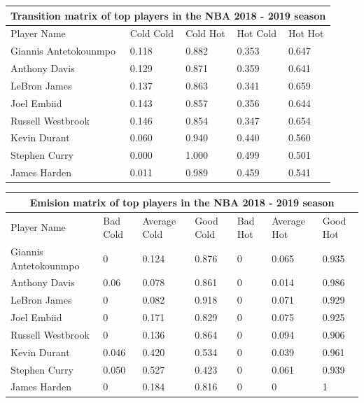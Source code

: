 \documentclass[12pt, authoryear]{elsarticle}
\begin{document}
\begin{tabular}{ |p{3cm}||p{2cm}|p{2cm}|p{2cm}|p{2cm}|  }
	\hline
	\multicolumn{5}{|c|}{Transition matrix of top players in the NBA 2018 - 2019 season} \\
	\hline
	Player Name & Cold Cold & Cold Hot &Hot Cold & Hot Hot\\
	\hline
	Giannis Antetokounmpo&   0.118 &	0.882 &	0.353 &	0.647\\
	Anthony Davis&   0.129&	0.871&	0.359&	0.641\\
	LeBron James &0.137&	0.863&	0.341&	0.659\\
	Joel Embiid&   0.143&	0.857&	0.356&	0.644\\
	Russell Westbrook& 0.146&	0.854&	0.347&	0.654\\
	Kevin Durant&   0.060&	0.940&	0.440&	0.560\\
	Stephen Curry& 0.000&	1.000&	0.499&	0.501\\
	James Harden&  0.011&	0.989&	0.459&	0.541\\
	\hline
\end{tabular}

\noindent\begin{tabular}{ |p{3cm}||p{1.5cm}|p{1.5cm}|p{1.5cm}|p{1.5cm}|p{1.5cm}|p{1.5cm}|  }
	\hline
	\multicolumn{7}{|c|}{Emision matrix of top players in the NBA 2018 - 2019 season} \\
	\hline
	Player Name &Bad Cold& Average Cold&	Good Cold&	Bad Hot&	Average Hot&	Good Hot\\
	\hline
	Giannis Antetokounmpo&   0&	0.124&	0.876&	0&	0.065&	0.935\\
	Anthony Davis&   0.06&	0.078&	0.861&	0&	0.014&	0.986\\
	LeBron James &0&	0.082&	0.918&	0&	0.071&	0.929\\
	Joel Embiid& 0& 0.171&	0.829&	0&	0.075&	0.925\\
	Russell Westbrook& 0&	0.136&	0.864&	0&	0.094&	0.906\\
	Kevin Durant&   0.046&	0.420&	0.534&	0&	0.039&	0.961\\
	Stephen Curry& 0.050&	0.527&	0.423&	0&	0.061&	0.939\\
	James Harden&  0&	0.184&	0.816&	0&	0&	1\\
	\hline
\end{tabular}
\end{document}
